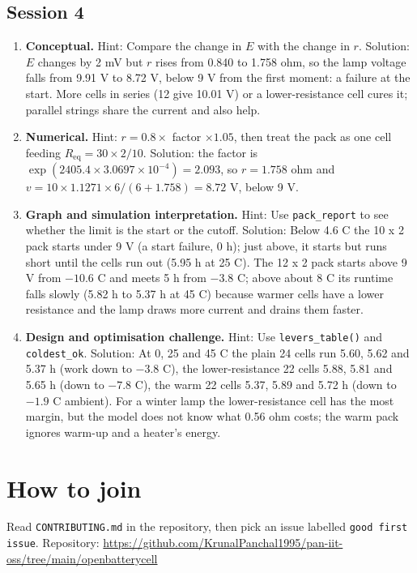 \documentclass[11pt,a4paper]{article}
\begin{document}
\subsection*{Session 4}
\begin{enumerate}[nosep]
\item \textbf{Conceptual.} Hint: Compare the change in $E$ with the change in $r$. Solution: $E$ changes by 2 mV but $r$ rises from 0.840 to 1.758 ohm, so the lamp voltage falls from 9.91 V to 8.72 V, below 9 V from the first moment: a failure at the start. More cells in series (12 give 10.01 V) or a lower-resistance cell cures it; parallel strings share the current and also help.
\item \textbf{Numerical.} Hint: $r=0.8\times$ factor $\times1.05$, then treat the pack as one cell feeding $R_{\mathrm{eq}}=30\times2/10$. Solution: the factor is $\exp(2405.4\times3.0697\times10^{-4})=2.093$, so $r=1.758$ ohm and $v=10\times1.1271\times6/(6+1.758)=8.72$ V, below 9 V.
\item \textbf{Graph and simulation interpretation.} Hint: Use \texttt{pack\_report} to see whether the limit is the start or the cutoff. Solution: Below 4.6 C the 10 x 2 pack starts under 9 V (a start failure, 0 h); just above, it starts but runs short until the cells run out (5.95 h at 25 C). The 12 x 2 pack starts above 9 V from $-10.6$ C and meets 5 h from $-3.8$ C; above about 8 C its runtime falls slowly (5.82 h to 5.37 h at 45 C) because warmer cells have a lower resistance and the lamp draws more current and drains them faster.
\item \textbf{Design and optimisation challenge.} Hint: Use \texttt{levers\_table()} and \texttt{coldest\_ok}. Solution: At 0, 25 and 45 C the plain 24 cells run 5.60, 5.62 and 5.37 h (work down to $-3.8$ C), the lower-resistance 22 cells 5.88, 5.81 and 5.65 h (down to $-7.8$ C), the warm 22 cells 5.37, 5.89 and 5.72 h (down to $-1.9$ C ambient). For a winter lamp the lower-resistance cell has the most margin, but the model does not know what 0.56 ohm costs; the warm pack ignores warm-up and a heater's energy.
\end{enumerate}

\section{How to join}
Read \texttt{CONTRIBUTING.md} in the repository, then pick an issue labelled \texttt{good first issue}. Repository: \url{https://github.com/KrunalPanchal1995/pan-iit-oss/tree/main/openbatterycell}
\end{document}
